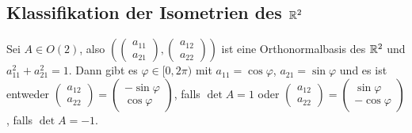 \documentclass[
 a4paper,
 12pt,
 parskip=half
 ]{scrartcl}
\theoremstyle{plain}
\theoremstyle{definition}
\begin{document}
\subsection*{Klassifikation der Isometrien des $\mathbb{R}^2$}
Sei $A \in O(2)$, also $\left(\begin{pmatrix} a_{11} \\ a_{21} \end{pmatrix}, \begin{pmatrix} a_{12} \\ a_{22} \end{pmatrix}\right)$ ist eine Orthonormalbasis des $\mathbb{R}^2$ und $a_{11}^2 + a_{21}^2 = 1$. Dann gibt es $\varphi \in [0,2 \pi)$ mit $a_{11} = \cos \varphi$, $a_{21} = \sin \varphi$ und es ist entweder $\begin{pmatrix} a_{12} \\ a_{22} \end{pmatrix} = \begin{pmatrix} - \sin \varphi \\ \cos \varphi \end{pmatrix}$, falls $\det A = 1$ oder $\begin{pmatrix} a_{12} \\ a_{22} \end{pmatrix} = \begin{pmatrix} \sin \varphi \\ - \cos \varphi \end{pmatrix}$, falls $\det A = -1$.
\end{document}
